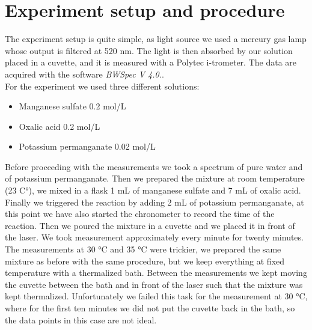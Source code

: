 \documentclass[a4paper,10pt]{article}
\begin{document}
\section{Experiment setup and procedure}
The experiment setup is quite simple, as light source we used a mercury gas lamp whose output is filtered at 520 nm. The light is then absorbed by our solution placed in a cuvette, and it is measured with a Polytec i-trometer. The data are acquired with the software \emph{BWSpec V 4.0.}.\\
For the experiment we used three different solutions:
\begin{itemize}
	\item Manganese sulfate  0.2 mol/L
	\item Oxalic acid  0.2 mol/L
	\item Potassium permanganate  0.02 mol/L
\end{itemize} 
Before proceeding with the measurements we took a spectrum of pure water and of potassium permanganate. Then we prepared the mixture at room temperature (23 C°), we mixed in a flask 1 mL of manganese sulfate and 7 mL of oxalic acid. Finally we triggered the reaction by adding 2 mL of potassium permanganate, at this point we have also started the chronometer to record the time of the reaction. Then we poured the mixture in a cuvette and we placed it in front of the laser. We took measurement approximately every minute for twenty minutes. \\
The measurements at 30 °C and 35 °C were trickier, we prepared the same mixture as before with the same procedure, but we keep everything at fixed temperature with a thermalized bath. Between the measurements we kept moving the cuvette between the bath and in front of the laser such that the mixture was kept thermalized. Unfortunately we failed this task for the measurement at 30 °C, where for the first ten minutes we did not put the cuvette back in the bath, so the data points in this case are not ideal.
\end{document}

